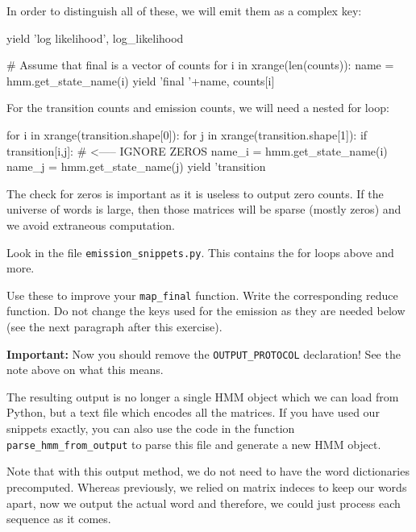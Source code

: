 In order to distinguish all of these, we will emit them as a complex key:

\begin{python}
yield 'log likelihood', log_likelihood

# Assume that final is a vector of counts
for i in xrange(len(counts)):
    name = hmm.get_state_name(i)
    yield 'final '+name, counts[i]
\end{python} %

For the transition counts and emission counts, we will need a nested for loop:

\begin{python}
for i in xrange(transition.shape[0]):
    for j in xrange(transition.shape[1]):
        if transition[i,j]: # <----- IGNORE ZEROS
            name_i = hmm.get_state_name(i)
            name_j = hmm.get_state_name(j)
            yield 'transition %
\end{python}

The check for zeros is important as it is useless to output zero counts. If the
universe of words is large, then those matrices will be sparse (mostly zeros)
and we avoid extraneous computation.

\begin{exercise}
Look in the file \verb+emission_snippets.py+. This contains the for loops above
and more.

Use these to improve your \verb+map_final+ function. Write the corresponding
reduce function. Do not change the keys used for the emission as they are
needed below (see the next paragraph after this exercise).

\textbf{Important:} Now you should remove the \verb+OUTPUT_PROTOCOL+
declaration! See the note above on what this means.
\end{exercise}

The resulting output is no longer a single HMM object which we can load from
Python, but a text file which encodes all the matrices. If you have used our
snippets exactly, you can also use the code in the function
\verb+parse_hmm_from_output+ to parse this file and generate a new HMM object.

Note that with this output method, we do not need to have the word dictionaries
precomputed. Whereas previously, we relied on matrix indeces to keep our words
apart, now we output the actual word and therefore, we could just process each
sequence as it comes.

